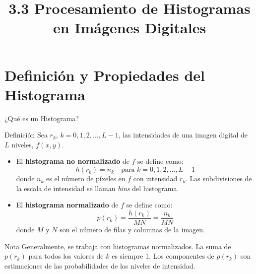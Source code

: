 \documentclass{beamer}
\begin{document}

\title[[Procesamiento de Histogramas]{3.3 Procesamiento de Histogramas en Imágenes Digitales}
\subtitle{}
\author[Tu Nombre/Institución]{}
\date{}
\institute{}
\begin{frame}
  \titlepage
\end{frame}

\section{Definición y Propiedades del Histograma}

\begin{frame}{¿Qué es un Histograma?}
  \begin{block}{Definición}\footnotesize
    Sea $r_k$, $k=0,1,2,...,L-1$, las intensidades de una imagen digital de $L$ niveles, $f(x,y)$.
    \begin{itemize}
        \item El \textbf{histograma no normalizado} de $f$ se define como:
          \begin{equation}
            h(r_k) = n_k \quad \text{para } k=0,1,2,...,L-1
          \end{equation}
          donde $n_k$ es el número de píxeles en $f$ con intensidad $r_k$. Las subdivisiones de la escala de intensidad se llaman \textit{bins} del histograma.
        \item El \textbf{histograma normalizado} de $f$ se define como:
          \begin{equation}
            p(r_k) = \frac{h(r_k)}{MN} = \frac{n_k}{MN}
          \end{equation}
          donde $M$ y $N$ son el número de filas y columnas de la imagen.
    \end{itemize}
  \end{block}
  \begin{exampleblock}{Nota}\footnotesize
    Generalmente, se trabaja con histogramas normalizados. La suma de $p(r_k)$ para todos los valores de $k$ es siempre 1. Los componentes de $p(r_k)$ son estimaciones de las probabilidades de los niveles de intensidad.
  \end{exampleblock}
\end{frame}
\end{document}
